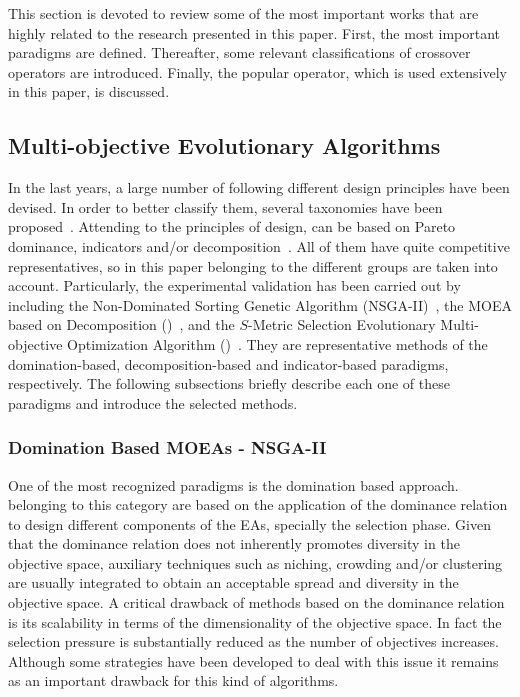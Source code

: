 This section is devoted to review some of the most important works that are highly related to the research presented in this paper.
%
First, the most important \MOEAS{} paradigms are defined.
%
Thereafter, some relevant classifications of crossover operators are introduced.
%
Finally, the popular \SBX{} operator, which is used extensively in this paper, is discussed.

\subsection{Multi-objective Evolutionary Algorithms}

In the last years, a large number of \MOEAS{} following different design principles have been devised.
%
In order to better classify them, several taxonomies have been proposed~\cite{Joel:BOOK_MOEAs}.
%
Attending to the principles of design, \MOEAS{} can be based on Pareto dominance, indicators and/or decomposition~\cite{pilat2010evolutionary}.
%
All of them have quite competitive representatives, so in this paper \MOEAS{} belonging to the different groups are taken into account.
%
Particularly, the experimental validation has been carried out by including the Non-Dominated Sorting Genetic Algorithm (NSGA-II)~\cite{Joel:NSGAII}, 
the MOEA based on Decomposition (\MOEAD{})~\cite{Joel:MOEAD}, and the $S$-Metric Selection Evolutionary Multi-objective Optimization Algorithm (\SMSEMOA{})~\cite{Joel:SMSEMOA}.
%
They are representative methods of the domination-based, decomposition-based and indicator-based paradigms, respectively.
%
The following subsections briefly describe each one of these paradigms and introduce the selected methods.

\subsubsection{Domination Based MOEAs - NSGA-II}

One of the most recognized paradigms is the domination based approach.
%
\MOEAS{} belonging to this category are based on the application of the dominance relation to design different components of the EAs, specially the selection phase.
%
Given that the dominance relation does not inherently promotes diversity in the objective space, auxiliary techniques such as niching, crowding and/or clustering 
are usually integrated to obtain an acceptable spread and diversity in the objective space.
%
A critical drawback of methods based on the dominance relation is its scalability in terms of the
dimensionality of the objective space.
%
In fact the selection pressure is substantially reduced as the number of objectives increases.
%
Although some strategies have been developed to deal with this issue \cite{horoba2008benefits} it remains 
as an important drawback for this kind of algorithms.

